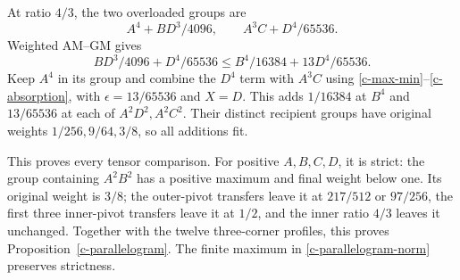 At ratio $4/3$, the two overloaded groups are
\[
 A^4+BD^3/4096,\qquad A^3C+D^4/65536.
\]
Weighted AM--GM gives
\[
 BD^3/4096+D^4/65536
 \le B^4/16384+13D^4/65536.
\]
Keep $A^4$ in its group and combine the $D^4$ term with $A^3C$ using
\eqref{c-max-min}--\eqref{c-absorption}, with
$\epsilon=13/65536$ and $X=D$.  This adds $1/16384$ at $B^4$ and
$13/65536$ at each of $A^2D^2,A^2C^2$.  Their distinct recipient
groups have original weights $1/256,9/64,3/8$, so all additions fit.

This proves every tensor comparison.  For positive $A,B,C,D$, it is
strict: the group containing $A^2B^2$ has a positive maximum and final
weight below one.  Its original weight is $3/8$; the outer-pivot transfers
leave it at $217/512$ or $97/256$, the first three inner-pivot transfers
leave it at $1/2$, and the inner ratio $4/3$ leaves it unchanged.
Together with the twelve three-corner profiles, this proves
Proposition~\ref{c-parallelogram}.  The finite maximum in
\eqref{c-parallelogram-norm} preserves strictness.
